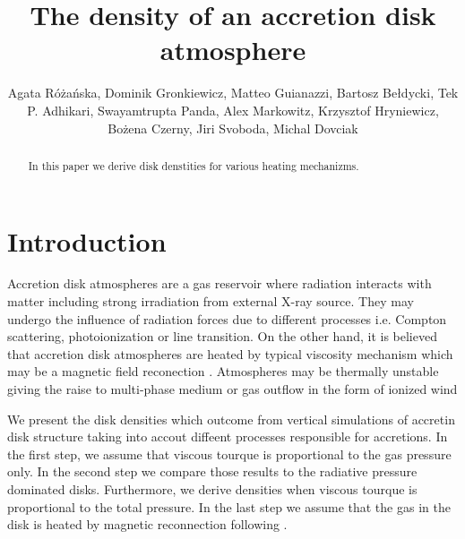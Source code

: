 \documentclass[preprint2]{aastex6}
\begin{document}
\title{The density of an accretion disk atmosphere}

\author{Agata R\'o\.za\'nska, Dominik Gronkiewicz, 
Matteo Guianazzi, Bartosz Be\l dycki, Tek P. Adhikari, Swayamtrupta Panda, Alex Markowitz, Krzysztof Hryniewicz, Bo\.zena Czerny, 
Jiri Svoboda, Michal Dovciak
}


\begin{abstract}

In this paper we derive disk denstities for various heating mechanizms. 
\end{abstract}


\section{Introduction}

Accretion disk atmospheres are a gas reservoir where radiation interacts with matter including 
strong irradiation from external X-ray source. They may undergo the influence of radiation forces due to different processes i.e. Compton scattering, photoionization or line transition. On the other hand, 
it is believed that accretion disk atmospheres are heated by typical viscosity mechanism which may be a magnetic field reconection \citep{1992-ToutPringle,1999-BalbusPapaloizou}. Atmospheres may be thermally unstable giving the raise to multi-phase medium \citep{} or gas outflow in the form of 
ionized wind \citep{}

We present the disk densities which outcome from vertical simulations of accretin disk structure 
taking into accout diffeent processes responsible for accretions. 
In the first step, we assume that viscous tourque is proportional to the gas pressure only. 
In the second step we compare those results to the radiative pressure dominated disks. 
Furthermore, we derive densities when viscous tourque is proportional to the total pressure. 
In the last step we assume that the gas in the disk is heated by magnetic reconnection 
following \citet{Gronkiewicz2018}. 
\end{document}
